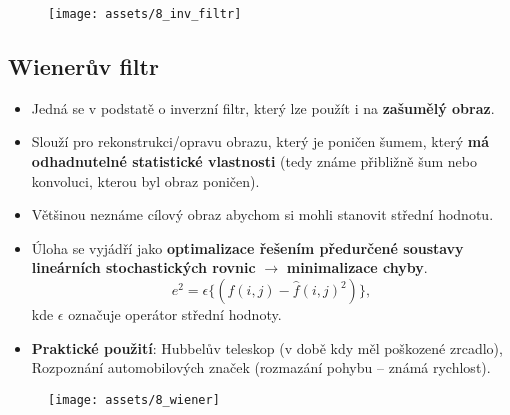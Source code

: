 \begin{figure}[H]
    \centering
    \texttt{[image: assets/8\_inv\_filtr]}
\end{figure}

\subsection{Wienerův filtr}
\begin{itemize}
    \item Jedná se v podstatě o inverzní filtr, který lze použít i na \textbf{zašumělý obraz}.
    \item Slouží pro rekonstrukci/opravu obrazu, který je poničen šumem, který \textbf{má odhadnutelné statistické vlastnosti} (tedy známe přibližně šum nebo konvoluci, kterou byl obraz poničen).
    \item Většinou neznáme cílový obraz abychom si mohli stanovit střední hodnotu.
    \item Úloha se vyjádří jako \textbf{optimalizace řešením předurčené soustavy lineárních stochastických rovnic} $\rightarrow$ \textbf{minimalizace chyby}.
          \begin{equation*}
              e^2 = \epsilon \{(f(i, j) - \hat{f}(i, j)^2 )\},
          \end{equation*}
          kde $\epsilon$ označuje operátor střední hodnoty.
    \item \textbf{Praktické použití}: Hubbelův teleskop (v době kdy měl poškozené zrcadlo), Rozpoznání automobilových značek (rozmazání pohybu -- známá rychlost).
\end{itemize}

\begin{figure}[H]
    \centering
    \texttt{[image: assets/8\_wiener]}
\end{figure}